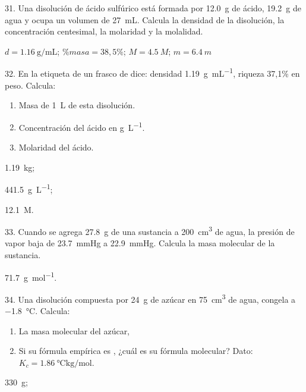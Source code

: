 \documentclass[10pt]{article}
\begin{document}
\begin{multicols}{2}
\begin{exercise}
  31. Una disolución de ácido sulfúrico está formada por \SI{12.0}{\gram} de
  ácido, \SI{19.2}{\gram} de agua y ocupa un volumen de \SI{27}{\milli\liter}. Calcula la densidad de la disolución, la concentración centesimal, la molaridad y la molalidad.
\end{exercise}
\begin{solution}
  $d = \SI{1.16}{\gram\per\milli\liter}$; $\%masa= 38,5\%$; $M= \SI{4.5}{M}$; $m= \SI{6.4}{m}$
\end{solution}

\begin{exercise}
  32. En la etiqueta de un frasco de  dice: densidad \SI{1.19}{\gram\per\milli\liter}, riqueza 37,1\% en peso. Calcula:
  \begin{enumerate}
    \item Masa de \SI{1}{\liter} de esta disolución.
    \item Concentración del ácido en \si{\gram\per\liter}.
    \item Molaridad del ácido.
  \end{enumerate}
\end{exercise}
\begin{solution}
  \begin{enumerate*}
    \item \SI{1,19}{\kilo\gram};
    \item \SI{441,5}{\gram\per\liter};
    \item \SI{12,1}{M}.
  \end{enumerate*}
\end{solution}

\begin{exercise}
  33. Cuando se agrega \SI{27.8}{\gram} de una sustancia a \SI{200}{\cubic\centi\meter} de agua, la presión de vapor baja de \SI{23.7}{\mmHg} a \SI{22.9}{\mmHg}. Calcula la masa molecular de la sustancia.
\end{exercise}
\begin{solution}
  \SI{71.7}{\gram\per\mole}.
\end{solution}

\begin{exercise}
  34. Una disolución compuesta por \SI{24}{\gram} de azúcar en \SI{75}{\cubic\centi\meter} de agua, congela a \SI{-1.8}{\celsius}. Calcula:
  \begin{enumerate}
    \item La masa molecular del azúcar,
    \item Si su fórmula empírica es , ¿cuál es su fórmula molecular? Dato: $K_c = \SI{1.86}{\celsius\kilo\gram\per\mole}$.
  \end{enumerate}
\end{exercise}
\begin{solution}
  \begin{enumerate*}
    \item \SI{330}{\gram};
    \item {}
  \end{enumerate*}
\end{solution}


\end{multicols}
\end{document}

